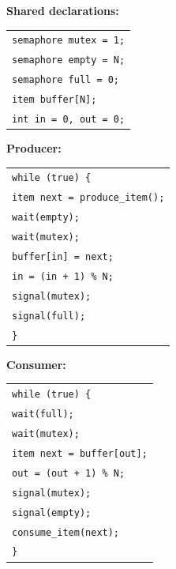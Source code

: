 \documentclass[11pt]{article}
\begin{document}
\begin{exemplebox}
\textbf{Shared declarations:}
\begin{center}
\begin{tabular}{|l|}
\hline
\texttt{semaphore mutex = 1;} \\
\texttt{semaphore empty = N;} \\
\texttt{semaphore full = 0;} \\
\texttt{item buffer[N];} \\
\texttt{int in = 0, out = 0;} \\
\hline
\end{tabular}
\end{center}
\textbf{Producer:}
\begin{center}
\begin{tabular}{|l|}
\hline
\texttt{while (true) \{} \\
\texttt{\quad item next = produce\_item();} \\
\texttt{\quad wait(empty);} \\
\texttt{\quad wait(mutex);} \\
\texttt{\quad buffer[in] = next;} \\
\texttt{\quad in = (in + 1) \%\ N;} \\
\texttt{\quad signal(mutex);} \\
\texttt{\quad signal(full);} \\
\texttt{\}} \\
\hline
\end{tabular}
\end{center}
\textbf{Consumer:}
\begin{center}
\begin{tabular}{|l|}
\hline
\texttt{while (true) \{} \\
\texttt{\quad wait(full);} \\
\texttt{\quad wait(mutex);} \\
\texttt{\quad item next = buffer[out];} \\
\texttt{\quad out = (out + 1) \%\ N;} \\
\texttt{\quad signal(mutex);} \\
\texttt{\quad signal(empty);} \\
\texttt{\quad consume\_item(next);} \\
\texttt{\}} \\
\hline
\end{tabular}
\end{center}
\end{exemplebox}
\end{document}
